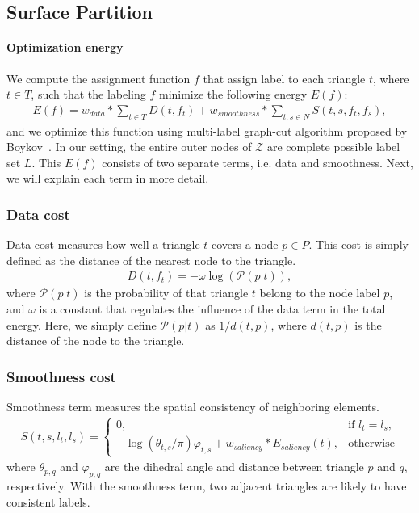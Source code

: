\subsection{Surface Partition}
\paragraph{Optimization energy}
We compute the assignment function $f$ that assign label to each triangle $t$, where $t \in T$, such that the labeling $f$ minimize the following energy $E(f)$:
\begin{align} \label{eq:graph}
E(f) = w_{data} * \sum_{t\in T}D(t, f_t) + w_{smoothness} * \sum_{t,s\in N} S(t, s, f_t, f_s),
\end{align}
and we optimize this function using multi-label graph-cut algorithm proposed by Boykov~\cite{boykov:2004:experimental}.
In our setting, the entire outer nodes of $\mathcal{Z}$ are complete possible label set $L$.
This $E(f)$ consists of two separate terms, i.e.\chinky{,} data and smoothness.
Next, we will explain each term in more detail.

\subsubsection{Data cost}
Data cost measures how well a triangle $t$ covers a node $p \in P$.
This cost is simply defined as the distance of the nearest node to the triangle.
\begin{align}
D(t, f_t) = -\omega \log(\mathcal{P}(p | t)),
\end{align}
where $\mathcal{P}(p | t)$ is the probability of that triangle $t$ belong to the node label $p$, and $\omega$ is a constant that
regulates the influence of the data term in the total energy.
Here, we simply define $\mathcal{P}(p | t)$ as $1/d(t,p)$, where $d(t,p)$ is the distance of the node to the triangle.
\subsubsection{Smoothness cost}
Smoothness term measures the spatial consistency of neighboring elements.
\begin{align}
S(t, s, l_t, l_s) = 
\begin{cases}
0, & \text{if } l_t = l_s, \\
-\log(\theta_{t,s}/\pi)\varphi_{t,s} + w_{saliency} * E_{saliency}(t), & \text{otherwise} 
\end{cases}
\end{align}
where $\theta_{p,q}$ and $\varphi_{p,q}$ are the dihedral angle and distance between triangle $p$ and $q$, respectively.
With the smoothness term, two adjacent triangles are likely to have consistent labels.

